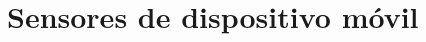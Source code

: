 \documentclass{article}
\begin{document}





\section{Sensores de dispositivo móvil}
\end{document}
